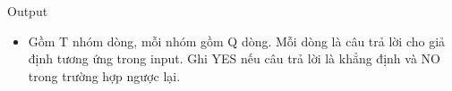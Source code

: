 Output
\begin{itemize}
	\item Gồm T nhóm dòng, mỗi nhóm gồm Q dòng. Mỗi dòng là câu trả lời cho giả định tương ứng trong input. Ghi YES nếu câu trả lời là khẳng định và NO trong trường hợp ngược lại.
\end{itemize}